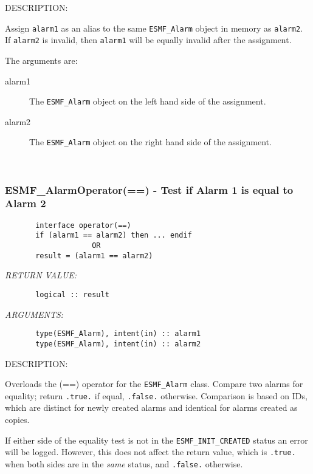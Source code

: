 {\sf DESCRIPTION:\\ }


       Assign {\tt alarm1} as an alias to the same {\tt ESMF\_Alarm} object in
       memory as {\tt alarm2}. If {\tt alarm2} is invalid, then {\tt alarm1}
       will be equally invalid after the assignment.
  
       The arguments are:
       \begin{description}
       \item[alarm1]
            The {\tt ESMF\_Alarm} object on the left hand side of the
            assignment.
       \item[alarm2]
            The {\tt ESMF\_Alarm} object on the right hand side of the
            assignment.
       \end{description}
   
 
\mbox{}\hrulefill\ 
 
\subsubsection [ESMF\_AlarmOperator(==)] {ESMF\_AlarmOperator(==) - Test if Alarm 1 is equal to Alarm 2}


  
\begin{verbatim}       interface operator(==)
       if (alarm1 == alarm2) then ... endif
                    OR
       result = (alarm1 == alarm2)\end{verbatim}{\em RETURN VALUE:}
\begin{verbatim}       logical :: result\end{verbatim}{\em ARGUMENTS:}
\begin{verbatim}       type(ESMF_Alarm), intent(in) :: alarm1
       type(ESMF_Alarm), intent(in) :: alarm2\end{verbatim}
{\sf DESCRIPTION:\\ }


       Overloads the (==) operator for the {\tt ESMF\_Alarm} class.
       Compare two alarms for equality; return {\tt .true.} if equal,
       {\tt .false.} otherwise. Comparison is based on IDs, which are distinct
       for newly created alarms and identical for alarms created as copies.
  
       If either side of the equality test is not in the
       {\tt ESMF\_INIT\_CREATED} status an error will be logged. However, this
       does not affect the return value, which is {\tt .true.} when both
       sides are in the {\em same} status, and {\tt .false.} otherwise.
  
